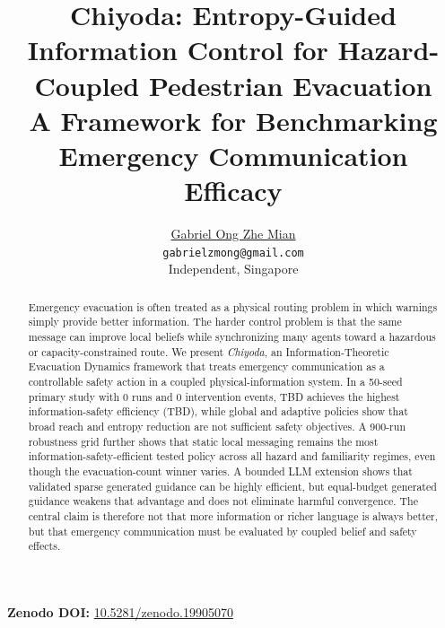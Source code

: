 \documentclass[10pt,a4paper,twocolumn]{article}
\title{Chiyoda: Entropy-Guided Information Control for Hazard-Coupled Pedestrian Evacuation\\
\large A Framework for Benchmarking Emergency Communication Efficacy}
\author{\href{https://gabrielongzm.com}{Gabriel Ong Zhe Mian}\\\texttt{gabrielzmong@gmail.com}\\Independent, Singapore}
\date{}
\newcommand{\statRunCount}{0}%
\newcommand{\statInterventionEvents}{0}%
\newcommand{\statBestPolicy}{TBD}%
\newcommand{\statBestEfficiency}{TBD}%
\begin{document}
\maketitle
\noindent\textbf{Zenodo DOI:} \href{https://doi.org/10.5281/zenodo.19905070}{10.5281/zenodo.19905070}

\begin{abstract}
Emergency evacuation is often treated as a physical routing problem in which
warnings simply provide better information. The harder control problem is that
the same message can improve local beliefs while synchronizing many agents
toward a hazardous or capacity-constrained route. We present \emph{Chiyoda}, an
Information-Theoretic Evacuation Dynamics framework that treats emergency
communication as a controllable safety action in a coupled
physical-information system. In a 50-seed primary study with \statRunCount{}
runs and \statInterventionEvents{} intervention events, \statBestPolicy{}
achieves the highest information-safety efficiency (\statBestEfficiency{}),
while global and adaptive policies show that broad reach and entropy reduction
are not sufficient safety objectives. A 900-run robustness grid further shows
that static local messaging remains the most information-safety-efficient
tested policy across all hazard and familiarity regimes, even though the
evacuation-count winner varies. A bounded LLM extension shows that validated
sparse generated guidance can be highly efficient, but equal-budget generated
guidance weakens that advantage and does not eliminate harmful convergence.
The central claim is therefore not that more information or richer language is
always better, but that emergency communication must be evaluated by coupled
belief and safety effects.
\end{abstract}














\end{document}
